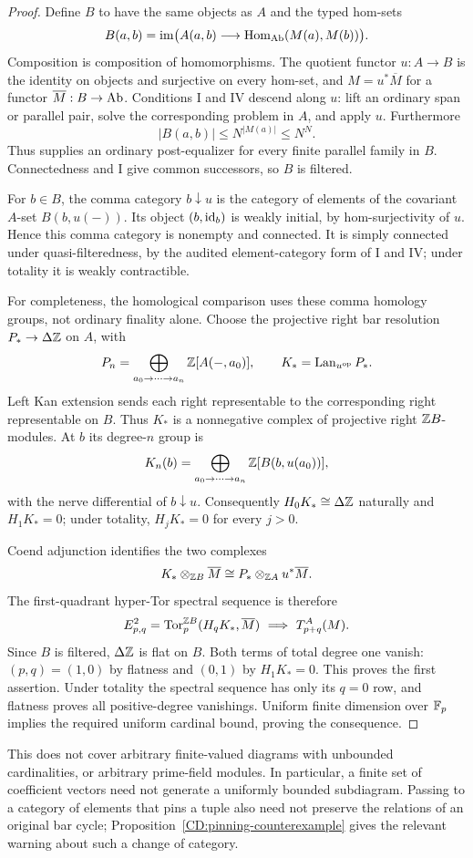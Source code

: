 \begin{proof}
Define $B$ to have the same objects as $A$ and the typed hom-sets
\[
 B(a,b)=\operatorname{im}\bigl(A(a,b)\longrightarrow
              \operatorname{Hom}_{\mathrm{Ab}}(M(a),M(b))\bigr).
\]
Composition is composition of homomorphisms. The quotient functor
$u:A\to B$ is the identity on objects and surjective on every
hom-set, and $M=u^*\overline M$ for a functor
$\overline M:B\to\mathrm{Ab}$. Conditions I and IV descend along $u$:
lift an ordinary span or parallel pair, solve the corresponding
problem in $A$, and apply $u$. Furthermore
\[
                   |B(a,b)|\leq N^{|M(a)|}\leq N^N.
\]
Thus \citet[Proposition~4.5]{IsbellMitchell1976} supplies an ordinary
post-equalizer for every finite parallel family in $B$. Connectedness
and I give common successors, so $B$ is filtered.

For $b\in B$, the comma category $b\mathbin\downarrow u$ is the
category of elements of the covariant $A$-set $B(b,u(-))$.
Its object $(b,\mathrm{id}_b)$ is weakly initial, by hom-surjectivity of
$u$. Hence this comma category is nonempty and connected. It is
simply connected under quasi-filteredness, by the audited
element-category form of I and IV; under totality it is weakly
contractible.

For completeness, the homological comparison uses these comma
homology groups, not ordinary finality alone. Choose the projective
right bar resolution $P_*\to\Delta\mathbb Z$ on $A$, with
\[
 P_n=\bigoplus_{a_0\to\cdots\to a_n}\mathbb Z[A(-,a_0)],
 \qquad K_* = \operatorname{Lan}_{u^{\mathrm{op}}}P_*.
\]
Left Kan extension sends each right representable to the
corresponding right representable on $B$. Thus $K_*$ is a
nonnegative complex of projective right $\mathbb Z B$-modules. At $b$ its
degree-$n$ group is
\[
 K_n(b)=\bigoplus_{a_0\to\cdots\to a_n}\mathbb Z[B(b,u(a_0))],
\]
with the nerve differential of $b\mathbin\downarrow u$.
Consequently $H_0K_*\cong\Delta\mathbb Z$ naturally and $H_1K_*=0$;
under totality, $H_jK_*=0$ for every $j>0$.

Coend adjunction identifies the two complexes
\[
 K_*\otimes_{\mathbb Z B}\overline M
       \cong P_*\otimes_{\mathbb Z A}u^*\overline M.
\]
The first-quadrant hyper-Tor spectral sequence is therefore
\[
 E^2_{p,q}=\operatorname{Tor}_p^{\mathbb Z B}(H_qK_*,\overline M)
       \ \Longrightarrow\ T_{p+q}^A(M).
\]
Since $B$ is filtered, $\Delta\mathbb Z$ is flat on $B$. Both terms of
total degree one vanish: $(p,q)=(1,0)$ by flatness and $(0,1)$ by
$H_1K_*=0$. This proves the first assertion. Under totality the
spectral sequence has only its $q=0$ row, and flatness proves all
positive-degree vanishings. Uniform finite dimension over $\mathbb F_p$
implies the required uniform cardinal bound, proving the consequence.
\end{proof}

This does not cover arbitrary finite-valued diagrams with unbounded
cardinalities, or arbitrary prime-field modules. In particular, a
finite set of coefficient vectors need not generate a uniformly
bounded subdiagram. Passing to a category of elements that pins a
tuple also need not preserve the relations of an original bar cycle;
Proposition~\ref{CD:pinning-counterexample} gives the relevant
warning about such a change of category.
